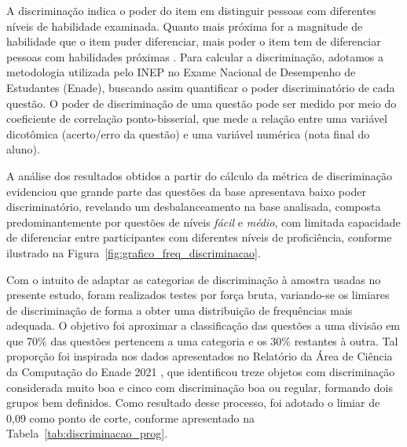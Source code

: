 \documentclass[12pt]{article}
\begin{document}
A discriminação indica o poder do item em distinguir pessoas com diferentes
níveis de habilidade examinada. Quanto mais próxima for a magnitude de habilidade
que o item puder diferenciar, mais poder o item tem de diferenciar pessoas com habilidades próximas \cite{pasquali2003}. Para calcular a discriminação, adotamos a metodologia utilizada pelo INEP no Exame Nacional de Desempenho de Estudantes (Enade), buscando assim quantificar o poder discriminatório de cada questão. O poder de discriminação de uma questão pode ser medido por meio do coeficiente de correlação ponto-bisserial, que mede a relação entre uma variável dicotômica (acerto/erro da questão) e uma variável numérica (nota final do aluno).

A análise dos resultados obtidos a partir do cálculo da métrica de discriminação evidenciou que grande parte das questões da base apresentava baixo poder discriminatório, revelando um desbalanceamento na base analisada, composta predominantemente por questões de níveis \textit{fácil} e \textit{médio}, com limitada capacidade de diferenciar entre participantes com diferentes níveis de proficiência, conforme ilustrado na Figura~\ref{fig:grafico_freq_discriminacao}.

Com o intuito de adaptar as categorias de discriminação à amostra usadas no presente estudo, foram realizados testes por força bruta, variando-se os limiares de discriminação de forma a obter uma distribuição de frequências mais adequada. O objetivo foi aproximar a classificação das questões a uma divisão em que 70\% das questões pertencem a uma categoria e os 30\% restantes à outra. Tal proporção foi inspirada nos dados apresentados no Relatório da Área de Ciência da Computação do Enade 2021 \cite{enade2021}, que identificou treze objetos com discriminação considerada muito boa e cinco com discriminação boa ou regular, formando dois grupos bem definidos. Como resultado desse processo, foi adotado o limiar de 0{,}09 como ponto de corte, conforme apresentado na Tabela~\ref{tab:discriminacao_prog}.
\end{document}
